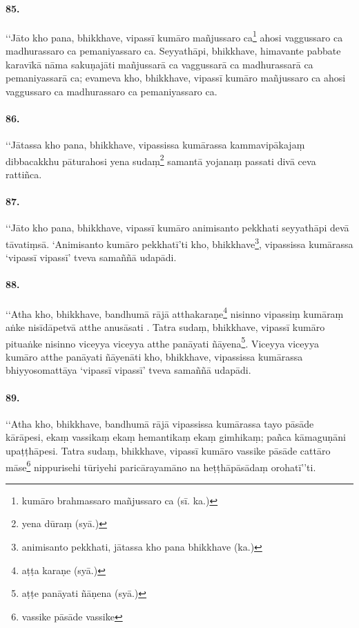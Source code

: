 \paragraph{85.} ‘‘Jāto kho pana, bhikkhave, vipassī kumāro mañjussaro ca\footnote{kumāro brahmassaro mañjussaro ca (sī. ka.)} ahosi vaggussaro ca madhurassaro ca pemaniyassaro ca. Seyyathāpi, bhikkhave, himavante pabbate karavīkā nāma sakuṇajāti mañjussarā ca vaggussarā ca madhurassarā ca pemaniyassarā ca; evameva kho, bhikkhave, vipassī kumāro mañjussaro ca ahosi vaggussaro ca madhurassaro ca pemaniyassaro ca.

\paragraph{86.} ‘‘Jātassa kho pana, bhikkhave, vipassissa kumārassa kammavipākajaṃ dibbacakkhu pāturahosi yena sudaṃ\footnote{yena dūraṃ (syā.)} samantā yojanaṃ passati divā ceva rattiñca.

\paragraph{87.} ‘‘Jāto kho pana, bhikkhave, vipassī kumāro animisanto pekkhati seyyathāpi devā tāvatiṃsā. ‘Animisanto kumāro pekkhatī’ti kho, bhikkhave\footnote{animisanto pekkhati, jātassa kho pana bhikkhave (ka.)}, vipassissa kumārassa ‘vipassī vipassī’ tveva samaññā udapādi.

\paragraph{88.} ‘‘Atha kho, bhikkhave, bandhumā rājā atthakaraṇe\footnote{aṭṭa karaṇe (syā.)} nisinno vipassiṃ kumāraṃ aṅke nisīdāpetvā atthe anusāsati . Tatra sudaṃ, bhikkhave, vipassī kumāro pituaṅke nisinno viceyya viceyya atthe panāyati ñāyena\footnote{aṭṭe panāyati ñāṇena (syā.)}. Viceyya viceyya kumāro atthe panāyati ñāyenāti kho, bhikkhave, vipassissa kumārassa bhiyyosomattāya ‘vipassī vipassī’ tveva samaññā udapādi.

\paragraph{89.} ‘‘Atha kho, bhikkhave, bandhumā rājā vipassissa kumārassa tayo pāsāde kārāpesi, ekaṃ vassikaṃ ekaṃ hemantikaṃ ekaṃ gimhikaṃ; pañca kāmaguṇāni upaṭṭhāpesi. Tatra sudaṃ, bhikkhave, vipassī kumāro vassike pāsāde cattāro māse\footnote{vassike pāsāde vassike} nippurisehi tūriyehi paricārayamāno na heṭṭhāpāsādaṃ orohatī’’ti.

